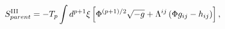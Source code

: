 \begin{equation}
S^{{\rm III}}_{parent}=-T_{p}\int d^{p+1}{\xi}\left[{\Phi}^{(p+1)/2}
\sqrt{-g}+{\Lambda}^{ij}\left({\Phi}g_{ij}-h_{ij}\right)\right],
\end{equation}

